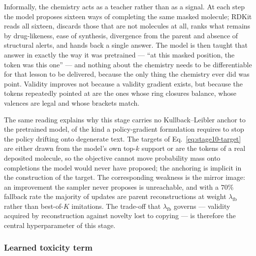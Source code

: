 \documentclass[a4paper,12pt]{article}
\begin{document}
Informally, the chemistry acts as a teacher rather than as a signal. At each
step the model proposes sixteen ways of completing the same masked molecule;
RDKit reads all sixteen, discards those that are not molecules at all, ranks
what remains by drug-likeness, ease of synthesis, divergence from the parent and
absence of structural alerts, and hands back a single answer. The model is then
taught that answer in exactly the way it was pretrained --- ``at this masked
position, the token was this one'' --- and nothing about the chemistry needs to
be differentiable for that lesson to be delivered, because the only thing the
chemistry ever did was point. Validity improves not because a validity gradient
exists, but because the tokens repeatedly pointed at are the ones whose ring
closures balance, whose valences are legal and whose brackets match.

The same reading explains why this stage carries no Kullback--Leibler anchor to
the pretrained model, of the kind a policy-gradient formulation requires to stop
the policy drifting onto degenerate text. The targets of
Eq.~\eqref{eq:stage10-target} are either drawn from the model's own top-$k$
support or are the tokens of a real deposited molecule, so the objective cannot
move probability mass onto completions the model would never have proposed; the
anchoring is implicit in the construction of the target. The corresponding
weakness is the mirror image: an improvement the sampler never proposes is
unreachable, and with a $70\%$ fallback rate the majority of updates are parent
reconstructions at weight $\lambda_{\mathrm{fb}}$ rather than best-of-$K$
imitations. The trade-off that $\lambda_{\mathrm{fb}}$ governs --- validity
acquired by reconstruction against novelty lost to copying --- is therefore the
central hyperparameter of this stage.

\subsubsection{Learned toxicity term}
\end{document}
